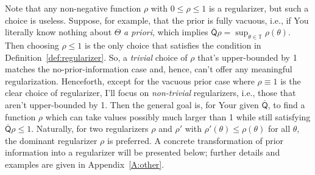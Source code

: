 \documentclass[a4paper, 12pt]{article}
\theoremstyle{plain}
\theoremstyle{definition}
\theoremstyle{remark}
\newcommand{\TT}{\mathbb{T}}
\newcommand{\uprior}{\overline{\mathsf{Q}}}
\begin{document}

Note that any non-negative function $\rho$ with $0 \leq \rho \leq 1$ is a regularizer, but such a choice is useless.  Suppose, for example, that the prior is fully vacuous, i.e., if You literally know nothing about $\Theta$ {\em a priori}, which implies $\uprior\rho = \sup_{\theta \in \TT} \rho(\theta)$.  Then choosing $\rho \leq 1$ is the only choice that satisfies the condition in Definition~\ref{def:regularizer}.  So, a {\em trivial} choice of $\rho$ that's upper-bounded by 1 matches the no-prior-information case and, hence, can't offer any meaningful regularization.  Henceforth, except for the vacuous prior case where $\rho \equiv 1$ is the clear choice of regularizer, I'll focus on {\em non-trivial} regularizers, i.e., those that aren't upper-bounded by 1. 
Then the general goal is, for Your given $\uprior$, to find a function $\rho$ which can take values possibly much larger than 1 while still satisfying $\uprior\rho \leq 1$.  Naturally, for two regularizers $\rho$ and $\rho'$ with $\rho'(\theta) \leq \rho(\theta)$ for all $\theta$, the dominant regularizer $\rho$ is preferred.  A concrete transformation of prior information into a regularizer will be presented below; further details and examples are given in Appendix~\ref{A:other}. 
\end{document}
